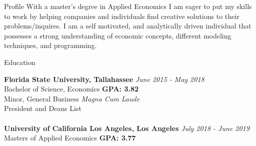 \documentclass{resume} %
\begin{document}
\begin{rSection}{Profile}
With a master’s degree in Applied Economics I am eager to put my skills to work by helping companies and individuals find creative solutions to their problems/inquires. I am a self motivated, and analytically driven individual that possesses a strong understanding of economic concepts, different modeling techniques, and programming. 
\end{rSection}

\begin{rSection}{Education}

{\bf Florida State University, Tallahassee} \hfill {\em June 2015 - May 2018} 
\\ Bachelor of Science, Economics \hfill { \bf GPA: 3.82}
\\ Minor, General Business \hfill {\em Magna Cum Laude}
\\ President and Deans List\\
\\{\bf University of California Los Angeles, Los Angeles} \hfill {\em July 2018 - June 2019} 
\\ Masters of Applied Economics\hfill { \bf GPA: 3.77 }
\end{rSection}
\end{document}
